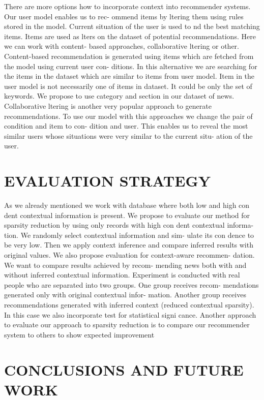 \documentclass[10pt]{extarticle}
\begin{document}
\begin{multicols}{2}
There are more options how to incorporate context into
recommender  systems.   Our  user  model  enables  us  to  rec-
ommend  items  by   ltering  them  using  rules  stored  in  the
model.  Current situation of the user is used to  nd the best
matching items.  Items are used as  lters on the dataset of
potential recommendations. Here we can work with content-
based approaches, collaborative  ltering or other.
Content-based recommendation is generated using items
which  are  fetched  from  the  model  using  current  user  con-
ditions.   In  this  alternative  we  are  searching  for  the  items
in the dataset which are similar to items from user model.
Item  in  the  user  model  is  not  necessarily  one  of  items  in
dataset.  It could be only the set of keywords.  We propose
to use category and section in our dataset of news.
Collaborative   ltering  is  another  very  popular  approach
to generate recommendations.  To use our model with this
approaches we change the pair of condition and item to con-
dition and user.  This enables us to reveal the most similar
users whose situations were very similar to the current situ-
ation of the user.

\section{EVALUATION STRATEGY}

As  we  already  mentioned  we  work  with  database  where
both low and high con dent contextual information is present.
We propose to evaluate our method for sparsity reduction by
using only records with high con dent contextual informa-
tion.  We randomly select contextual information and sim-
ulate its con dence to be very low.  Then we apply context
inference and compare inferred results with original values.
We also propose evaluation for context-aware recommen-
dation.   We  want  to  compare  results  achieved  by  recom-
mending  news  both  with  and  without  inferred  contextual
information.  Experiment is conducted with real people who
are separated into two groups.  One group receives recom-
mendations  generated  only  with  original  contextual  infor-
mation. Another group receives recommendations generated
with inferred context (reduced contextual sparsity).  In this
case we also incorporate test for statistical signi cance.
Another  approach  to  evaluate  our  approach  to  sparsity
reduction is to compare our recommender system to others
to show expected improvement

\section{CONCLUSIONS AND FUTURE WORK}


\end{multicols}
\end{document}
